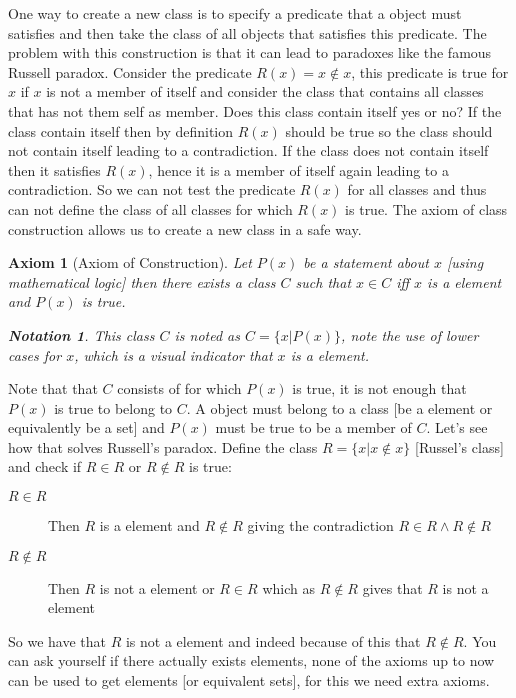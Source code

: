 \documentclass{book}
\newcommand{\nin}{\not\in}
\newcommand{\tmtextbf}[1]{\text{{\bfseries{#1}}}}
\newtheorem{axiom}{Axiom}
{\theorembodyfont{\rmfamily}\newtheorem{convention}{Convention}}
\newtheorem{notation}{Notation}
{\theorembodyfont{\rmfamily}\newtheorem{note}{Note}}
\begin{document}
One way to create a new class is to specify a predicate that a object must
satisfies and then take the class of all objects that satisfies this
predicate. The problem with this construction is that it can lead to paradoxes
like the famous Russell paradox. Consider the predicate $R (x) = x \nin x$,
this predicate is true for $x$ if $x$ is not a member of itself and consider
the class that contains all classes that has not them self as member. Does
this class contain itself yes or no? If the class contain itself then by
definition $R (x)$ should be true so the class should not contain itself
leading to a contradiction. If the class does not contain itself then it
satisfies $R (x)$, hence it is a member of itself again leading to a
contradiction. So we can not test the predicate $R (x)$ for all classes and
thus can not define the class of all classes for which $R (x)$ is true. The
axiom of class construction allows us to create a new class in a safe way.

\begin{axiom}[Axiom of Construction]
  \label{axiom of construction}Let $P (x)$ be a statement about $x$ [using
  mathematical logic] then there exists a class $C$ such that $x \in C$ iff
  $x$ is a element and $P (x)$ is true.
  
  \begin{notation}
    This class $C$ is noted as $C = \{ x|P (x) \}$, note the use of lower
    cases for $x$, which is a visual indicator that $x$ is a element.
  \end{notation}
\end{axiom}

Note that that $C$ consists of \tmtextbf{elements} for which $P (x)$ is true,
it is not enough that $P (x)$ is true to belong to $C$. A object must belong
to a class [be a element or equivalently be a set] and $P (x)$ must be true to
be a member of $C$. Let's see how that solves Russell's paradox. Define the
class $R = \{ x|x \nin x \}$ [Russel's class] and check if $R \in R$ or $R
\nin R$ is true:
\begin{description}
  \item[$R \in R$] Then $R$ is a element and $R \nin R$ giving the
  contradiction $R \in R \wedge R \nin R$
  
  \item[$R \nin R$] Then $R$ is not a element or $R \in R$ which as $R \nin R$
  gives that $R$ is not a element
\end{description}
So we have that $R$ is not a element and indeed because of this that $R \nin
R$. You can ask yourself if there actually exists elements, none of the axioms
up to now can be used to get elements [or equivalent sets], for this we need
extra axioms.
\end{document}
